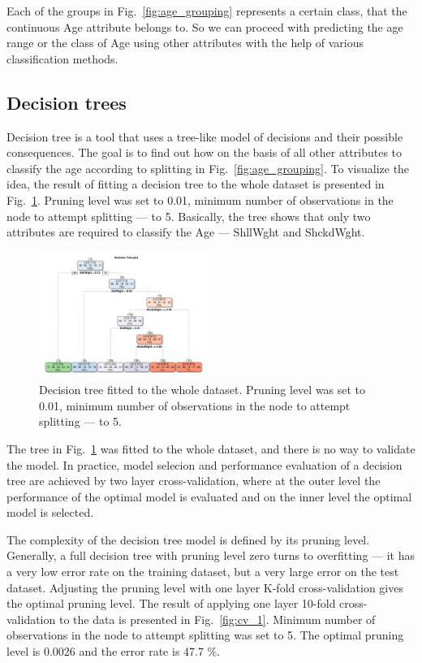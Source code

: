 \documentclass[10pt, paper=a4]{article}
\begin{document}
Each of the groups in Fig.~\ref{fig:age_grouping} represents a certain
class, that the continuous Age attribute belongs to.  So we can
proceed with predicting the age range or the class of Age using other
attributes with the help of various classification methods.

\subsection{Decision trees}
Decision tree is a tool that uses a tree-like model of decisions and
their possible consequences.  The goal is to find out how on the basis
of all other attributes to classify the age according to splitting in
Fig.~\ref{fig:age_grouping}.  To visualize the idea, the result of
fitting a decision tree to the whole dataset is presented in
Fig.~\ref{fig:decision_tree}.  Pruning level was set to 0.01, minimum
number of observations in the node to attempt splitting --- to 5.
Basically, the tree shows that only two attributes are required to
classify the Age --- ShllWght and ShckdWght.

\begin{figure}[htbp]
  \centering
  \includegraphics[width = 0.49\textwidth]{decision_tree.pdf}
  \caption{Decision tree fitted to the whole dataset.  Pruning level
    was set to 0.01, minimum number of observations in the node to
    attempt splitting --- to 5.}
  \label{fig:decision_tree}
\end{figure}

The tree in Fig.~\ref{fig:decision_tree} was fitted to the whole
dataset, and there is no way to validate the model.  In practice,
model selecion and performance evaluation of a decision tree are
achieved by two layer cross-validation, where at the outer level the
performance of the optimal model is evaluated and on the inner level
the optimal model is selected.

The complexity of the decision tree model is defined by its pruning
level.  Generally, a full decision tree with pruning level zero turns
to overfitting --- it has a very low error rate on the training
dataset, but a very large error on the test dataset.  Adjusting the
pruning level with one layer K-fold cross-validation gives the optimal
pruning level.  The result of applying one layer 10-fold
cross-validation to the data is presented in Fig.~\ref{fig:cv_1}.
Minimum number of observations in the node to attempt splitting was
set to 5.  The optimal pruning level is 0.0026 and the error rate is
47.7 \%.
\end{document}
